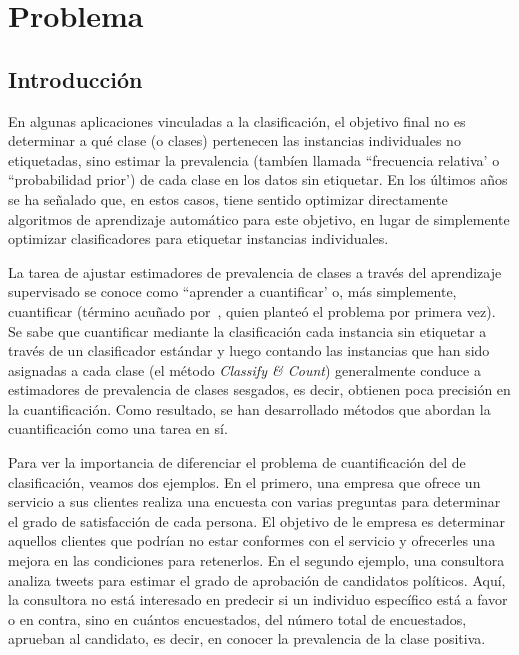 \chapter{Problema}\label{problema}

\section{Introducción}\label{problema:introduccion}

En algunas aplicaciones vinculadas a la clasificación, el objetivo final no es
determinar a qué clase (o clases) pertenecen las instancias individuales no
etiquetadas, sino estimar la prevalencia (tambíen llamada ``frecuencia relativa'
o ``probabilidad prior') de cada clase en los datos sin etiquetar. En los
últimos años se ha señalado que, en estos casos, tiene sentido optimizar
directamente algoritmos de aprendizaje automático para este objetivo, en lugar
de simplemente optimizar clasificadores para etiquetar instancias individuales.

La tarea de ajustar estimadores de prevalencia de clases a través del
aprendizaje supervisado se conoce como ``aprender a cuantificar' o, más
simplemente, cuantificar (término acuñado por~\citet{forman2005counting}, quien
planteó el problema por primera vez). Se sabe que cuantificar mediante la
clasificación cada instancia sin etiquetar a través de un clasificador estándar
y luego contando las instancias que han sido asignadas a cada clase (el método
{\it Classify \& Count\/}) generalmente conduce a estimadores de prevalencia de
clases sesgados, es decir, obtienen poca precisión en la cuantificación. Como
resultado, se han desarrollado métodos que abordan la cuantificación como una
tarea en sí.

Para ver la importancia de diferenciar el problema de cuantificación del de
clasificación, veamos dos ejemplos. En el primero, una empresa que ofrece un
servicio a sus clientes realiza una encuesta con varias preguntas para
determinar el grado de satisfacción de cada persona. El objetivo de le empresa
es determinar aquellos clientes que podrían no estar conformes con el servicio y
ofrecerles una mejora en las condiciones para retenerlos. En el segundo ejemplo,
una consultora analiza tweets para estimar el grado de aprobación de candidatos
políticos. Aquí, la consultora no está interesado en predecir si un individuo
específico está a favor o en contra, sino en cuántos encuestados, del número
total de encuestados, aprueban al candidato, es decir, en conocer la prevalencia
de la clase positiva.

